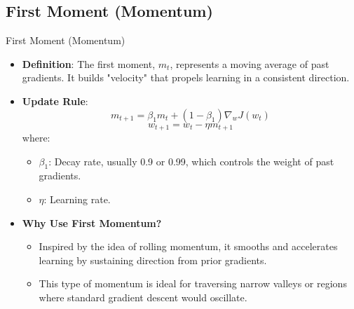 \documentclass[serif, aspectratio=169]{beamer}
\begin{document}
\subsection{First Moment (Momentum)}
\begin{frame}{First Moment (Momentum)}
    \begin{itemize}
        \item \textbf{Definition}: The first moment, \( m_t \), represents a moving average of past gradients. It builds "velocity" that propels learning in a consistent direction.
        \item \textbf{Update Rule}:
        \[
        m_{t+1} = \beta_1 m_t + (1 - \beta_1) \nabla_w J(w_t)
        \]
        \[
        w_{t+1} = w_t - \eta m_{t+1}
        \]
        where:
        \begin{itemize}
            \item \( \beta_1 \): Decay rate, usually 0.9 or 0.99, which controls the weight of past gradients.
            \item \( \eta \): Learning rate.
        \end{itemize}
        \item \textbf{Why Use First Momentum?}
        \begin{itemize}
            \item Inspired by the idea of rolling momentum, it smooths and accelerates learning by sustaining direction from prior gradients.
            \item This type of momentum is ideal for traversing narrow valleys or regions where standard gradient descent would oscillate.
        \end{itemize}
    \end{itemize}
\end{frame}
\end{document}
